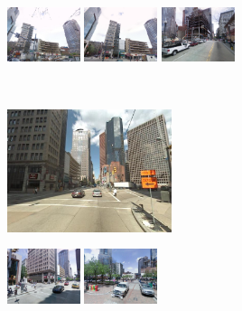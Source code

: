 \documentclass[table]{article} %
\begin{document}
\begin{figure}[t!]
\begin{minipage}{0.75\linewidth}
\begin{minipage}{\linewidth}
                \colorbox{myRed}{\includegraphics[height=16mm]{imgs/ex1/FV2}}
                \colorbox{myRed}{\includegraphics[height=16mm]{imgs/ex1/FV3}}
                \colorbox{myRed}{\includegraphics[height=16mm]{imgs/ex1/FV4}}
            \end{minipage} 
        \end{minipage}
        \\
        \begin{minipage}{0.34\linewidth}
            \centering
            \vspace{0mm}
            \includegraphics[height=36mm]{imgs/ex2/query}
        \end{minipage}
        \begin{minipage}{0.75\linewidth}
            \begin{minipage}{\linewidth} 
                \colorbox{myGreen}{\includegraphics[height=16mm]{imgs/ex2/FVsvm1}}
                \colorbox{myGreen}{\includegraphics[height=16mm]{imgs/ex2/FVsvm2}}

\end{minipage}
\end{minipage}
\end{figure}
\end{document}
